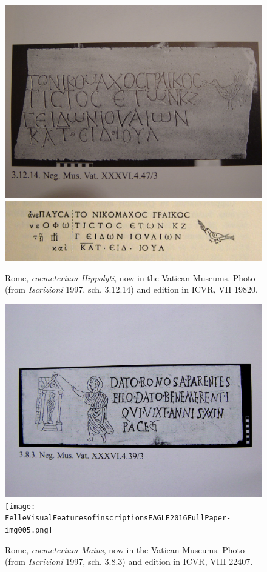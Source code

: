 \documentclass[amsthm,ebook]{saparticle}
\begin{document}
\begin{figure}[!hbp]
\centering
 \includegraphics[width=\columnwidth]{FelleVisualFeaturesofinscriptionsEAGLE2016FullPaper-img002.jpg}
 \includegraphics[width=\columnwidth]{FelleVisualFeaturesofinscriptionsEAGLE2016FullPaper-img003.png}
\caption{Rome, \emph{coemeterium Hippolyti}, now in the Vatican Museums. Photo (from \emph{Iscrizioni} 1997, sch. 3.12.14) and
edition in ICVR, VII 19820.}
\label{fig:3}
\end{figure}




\begin{figure}[!hbp]
\centering
 \includegraphics[width=\columnwidth]{FelleVisualFeaturesofinscriptionsEAGLE2016FullPaper-img004.png}
  \texttt{[image: FelleVisualFeaturesofinscriptionsEAGLE2016FullPaper-img005.png]}

\caption{Rome, \emph{coemeterium Maius}, now in the Vatican Museums. Photo (from \emph{Iscrizioni} 1997, sch. 3.8.3) and edition in
ICVR, VIII 22407.}
\label{fig:4}
\end{figure}
\end{document}
